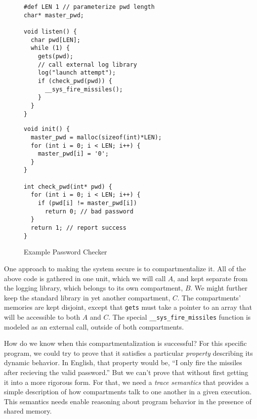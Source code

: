 \documentclass{article}
\begin{document}
\begin{figure}
  \begin{minipage}[t]{0.5\textwidth}
\begin{verbatim}
#def LEN 1 // parameterize pwd length
char* master_pwd;

void listen() {
  char pwd[LEN];
  while (1) {
    gets(pwd);
    // call external log library 
    log("launch attempt");
    if (check_pwd(pwd)) {
      __sys_fire_missiles();
    }
  }
}
\end{verbatim}
  \end{minipage}
  \begin{minipage}[t]{0.49\textwidth}
\begin{verbatim}
void init() {
  master_pwd = malloc(sizeof(int)*LEN);
  for (int i = 0; i < LEN; i++) {
    master_pwd[i] = '0';
  }
}

int check_pwd(int* pwd) {
  for (int i = 0; i < LEN; i++) {
    if (pwd[i] != master_pwd[i])
      return 0; // bad password
  }
  return 1; // report success
}
\end{verbatim}
  \end{minipage}

\caption{Example Password Checker}
\label{fig:exchecker}
\end{figure}

One approach to making the system secure is to compartmentalize it. All of the above code
is gathered in one unit, which we will call \(A\), and kept separate from the logging library,
which belongs to its own compartment, \(B\). We might further keep the standard library in yet
another compartment, \(C\). The compartments' memories are kept disjoint, except that {\tt gets}
must take a pointer to an array that will be accessible to both \(A\) and \(C\).
The special {\tt \_\_sys\_fire\_missiles} function is modeled as an external call,
outside of both compartments.

How do we know when this compartmentalization is successful? For this specific program,
we could try to prove that it satisfies a particular {\em property} describing its dynamic behavior.
In English, that property would be, ``I only fire the missiles after recieving the valid password.''
But we can't prove that without first getting it into a more rigorous form. For that, we
need a {\em trace semantics} that provides a simple description of how compartments talk to
one another in a given execution. This semantics needs enable reasoning about program behavior
in the presence of shared memory.
\end{document}
